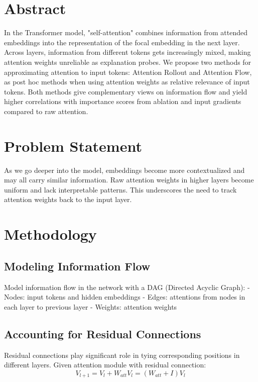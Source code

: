 
\section{Abstract}
In the Transformer model, "self-attention" combines information from attended embeddings into the representation of the focal embedding in the next layer. Across layers, information from different tokens gets increasingly mixed, making attention weights unreliable as explanation probes. We propose two methods for approximating attention to input tokens: Attention Rollout and Attention Flow, as post hoc methods when using attention weights as relative relevance of input tokens. Both methods give complementary views on information flow and yield higher correlations with importance scores from ablation and input gradients compared to raw attention.

\section{Problem Statement}
As we go deeper into the model, embeddings become more contextualized and may all carry similar information. Raw attention weights in higher layers become uniform and lack interpretable patterns. This underscores the need to track attention weights back to the input layer.

\section{Methodology}

\subsection{Modeling Information Flow}
Model information flow in the network with a DAG (Directed Acyclic Graph):
- Nodes: input tokens and hidden embeddings
- Edges: attentions from nodes in each layer to previous layer
- Weights: attention weights

\subsection{Accounting for Residual Connections}
Residual connections play significant role in tying corresponding positions in different layers. Given attention module with residual connection:
\begin{equation}
V_{l+1} = V_l + W_{att}V_l = (W_{att} + I)V_l
\end{equation}

